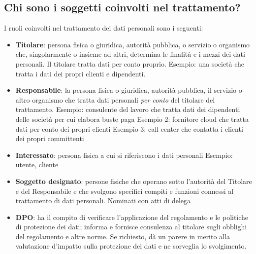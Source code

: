 \subsection{Chi sono i soggetti coinvolti nel trattamento?}
I ruoli coinvolti nel trattamento dei dati personali sono i seguenti:
\begin{itemize}
    \item \textbf{Titolare}: persona fisica o giuridica, autorità pubblica, o
        servizio o organismo che, singolarmente o insieme ad altri, determina
        le finalità e i mezzi dei dati personali.
    Il titolare tratta dati per conto proprio.
    \newline
    Esempio: una società che tratta i dati dei propri clienti e dipendenti.

    \item \textbf{Responsabile}: la persona fisica o giuridica, autorità
        pubblica, il servizio o altro organismo che tratta dati personali
        \textit{per conto} del titolare del trattamento.
    \newline
    Esempio: consulente del lavoro che tratta dati dei dipendenti delle società
        per cui elabora buste paga
    \newline
    Esempio 2: fornitore cloud che tratta dati per conto dei propri clienti
    \newline
    Esempio 3: call center che contatta i clienti dei propri committenti

    \item \textbf{Interessato}: persona fisica a cui si riferiscono i dati personali
    Esempio: utente, cliente

    \item \textbf{Soggetto designato}: persone fisiche che operano sotto
        l'autorità del Titolare e del Responsabile e che svolgono specifici
        compiti e funzioni connessi al trattamento di dati personali. Nominati
        con atti di delega

    \item \textbf{DPO}: ha il compito di verificare l'applicazione del
        regolamento e le politiche di protezione dei dati; informa e fornisce
        consulenza al titolare sugli obblighi del regolamento e altre norme.
    Se richiesto, dà un parere in merito alla valutazione d'impatto sulla
        protezione dei dati e ne sorveglia lo svolgimento.
\end{itemize}

